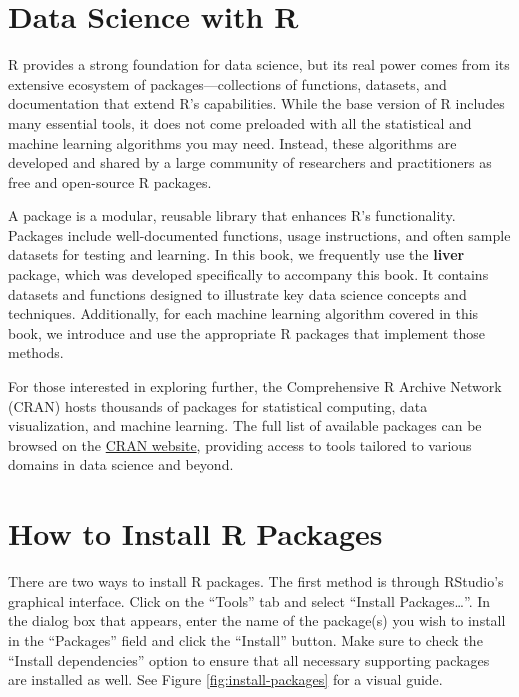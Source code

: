 \documentclass[
]{book}
\theoremstyle{definition}
\theoremstyle{definition}
\theoremstyle{definition}
\theoremstyle{definition}
\theoremstyle{remark}
\begin{document}
\section{Data Science with R}\label{data-science-with-r}

R provides a strong foundation for data science, but its real power comes from its extensive ecosystem of packages---collections of functions, datasets, and documentation that extend R's capabilities. While the base version of R includes many essential tools, it does not come preloaded with all the statistical and machine learning algorithms you may need. Instead, these algorithms are developed and shared by a large community of researchers and practitioners as free and open-source R packages.

A package is a modular, reusable library that enhances R's functionality. Packages include well-documented functions, usage instructions, and often sample datasets for testing and learning. In this book, we frequently use the \textbf{liver} package, which was developed specifically to accompany this book. It contains datasets and functions designed to illustrate key data science concepts and techniques. Additionally, for each machine learning algorithm covered in this book, we introduce and use the appropriate R packages that implement those methods.

For those interested in exploring further, the Comprehensive R Archive Network (CRAN) hosts thousands of packages for statistical computing, data visualization, and machine learning. The full list of available packages can be browsed on the \href{https://CRAN.R-project.org}{CRAN website}, providing access to tools tailored to various domains in data science and beyond.

\section{How to Install R Packages}\label{install-packages}

There are two ways to install R packages. The first method is through RStudio's graphical interface. Click on the ``Tools'' tab and select ``Install Packages\ldots{}''. In the dialog box that appears, enter the name of the package(s) you wish to install in the ``Packages'' field and click the ``Install'' button. Make sure to check the ``Install dependencies'' option to ensure that all necessary supporting packages are installed as well. See Figure \ref{fig:install-packages} for a visual guide.
\end{document}

